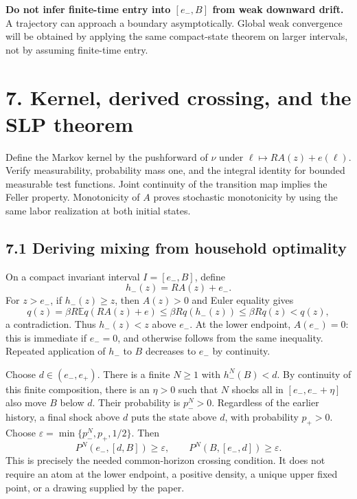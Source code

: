 \documentclass[
  11pt,
]{article}
\begin{document}
\textbf{Do not infer finite-time entry into \([e_-,B]\) from weak
downward drift.} A trajectory can approach a boundary asymptotically.
Global weak convergence will be obtained by applying the same
compact-state theorem on larger intervals, not by assuming finite-time
entry.

\section{7. Kernel, derived crossing, and the SLP
theorem}\label{kernel-derived-crossing-and-the-slp-theorem}

Define the Markov kernel by the pushforward of \(\nu\) under
\(\ell\mapsto RA(z)+e(\ell)\). Verify measurability, probability mass
one, and the integral identity for bounded measurable test functions.
Joint continuity of the transition map implies the Feller property.
Monotonicity of \(A\) proves stochastic monotonicity by using the same
labor realization at both initial states.

\subsection{7.1 Deriving mixing from household
optimality}\label{deriving-mixing-from-household-optimality}

On a compact invariant interval \(I=[e_-,B]\), define \[
h_-(z)=RA(z)+e_-.
\] For \(z>e_-\), if \(h_-(z)\geq z\), then \(A(z)>0\) and Euler
equality gives \[
q(z)=\beta R\mathbb E q(RA(z)+e)\leq\beta Rq(h_-(z))
\leq\beta Rq(z)<q(z),
\] a contradiction. Thus \(h_-(z)<z\) above \(e_-\). At the lower
endpoint, \(A(e_-)=0\): this is immediate if \(e_-=0\), and otherwise
follows from the same inequality. Repeated application of \(h_-\) to
\(B\) decreases to \(e_-\) by continuity.

Choose \(d\in(e_-,e_+)\). There is a finite \(N\geq1\) with
\(h_-^N(B)<d\). By continuity of this finite composition, there is an
\(\eta>0\) such that \(N\) shocks all in \([e_-,e_-+\eta]\) also move
\(B\) below \(d\). Their probability is \(p_-^N>0\). Regardless of the
earlier history, a final shock above \(d\) puts the state above \(d\),
with probability \(p_+>0\). Choose
\(\varepsilon=\min\{p_-^N,p_+,1/2\}\). Then \[
P^N(e_-,[d,B])\geq\varepsilon,
\qquad P^N(B,[e_-,d])\geq\varepsilon.
\] This is precisely the needed common-horizon crossing condition. It
does not require an atom at the lower endpoint, a positive density, a
unique upper fixed point, or a drawing supplied by the paper.
\end{document}
